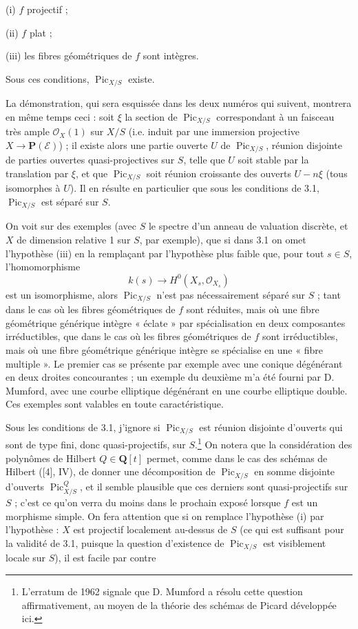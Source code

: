 \noindent (i) $f$ projectif ;

\noindent (ii) $f$ plat ;

\noindent (iii) les fibres géométriques de $f$ sont intègres.

Sous ces conditions, $\operatorname{Pic}_{X/S}$ existe.

La démonstration, qui sera esquissée dans les deux numéros qui suivent,
montrera en même temps ceci : soit $\xi$ la section de
$\operatorname{Pic}_{X/S}$ correspondant à un faisceau très ample
$\mathcal O_X(1)$ sur $X/S$ (i.e. induit par une immersion projective
$X\longrightarrow\mathbf P(\mathcal E)$) ; il existe alors une partie ouverte
$U$ de $\operatorname{Pic}_{X/S}$, réunion disjointe de parties ouvertes
quasi-projectives sur $S$, telle que $U$ soit stable par la translation par
$\xi$, et que $\operatorname{Pic}_{X/S}$ soit réunion croissante des ouverts
$U-n\xi$ (tous isomorphes à $U$). Il en résulte en particulier que sous les
conditions de 3.1, $\operatorname{Pic}_{X/S}$ est séparé sur $S$.

 On voit sur des exemples (avec $S$ le spectre d'un
anneau de valuation discrète, et $X$ de dimension relative 1 sur $S$, par
exemple), que si dans 3.1 on omet l'hypothèse (iii) en la remplaçant par
l'hypothèse plus faible que, pour tout $s\in S$, l'homomorphisme
\[
k(s)\longrightarrow H^0(X_s,\mathcal O_{X_s})
\]
est un isomorphisme, alors $\operatorname{Pic}_{X/S}$ n'est pas nécessairement
séparé sur $S$ ; tant dans le cas où les fibres géométriques de $f$ sont
réduites, mais où une fibre géométrique générique intègre « éclate » par
spécialisation en deux composantes irréductibles, que dans le cas où les fibres
géométriques de $f$ sont irréductibles, mais où une fibre géométrique générique
intègre se spécialise en une « fibre multiple ». Le premier cas se présente par
exemple avec une conique dégénérant en deux droites concourantes ; un exemple
du deuxième m'a été fourni par D. Mumford, avec une courbe elliptique dégénérant
en une courbe elliptique double. Ces exemples sont valables en toute
caractéristique.

 Sous les conditions de 3.1, j'ignore si
$\operatorname{Pic}_{X/S}$ est réunion disjointe d'ouverts qui sont de type
fini, donc quasi-projectifs, sur $S$.\footnote{L'erratum de 1962 signale que
D. Mumford a résolu cette question affirmativement, au moyen de la théorie des
schémas de Picard développée ici.} On notera que la considération des polynômes
de Hilbert $Q\in\mathbf Q[t]$ permet, comme dans le cas des schémas de Hilbert
([4], IV), de donner une décomposition de $\operatorname{Pic}_{X/S}$ en somme
disjointe d'ouverts $\operatorname{Pic}^{Q}_{X/S}$, et il semble plausible que
ces derniers sont quasi-projectifs sur $S$ ; c'est ce qu'on verra du moins dans
le prochain exposé lorsque $f$ est un morphisme simple. On fera attention que
si on remplace l'hypothèse (i) par l'hypothèse : $X$ est projectif localement
au-dessus de $S$ (ce qui est suffisant pour la validité de 3.1, puisque la
question d'existence de $\operatorname{Pic}_{X/S}$ est visiblement locale sur
$S$), il est facile par contre

